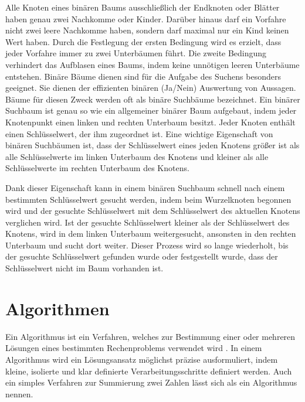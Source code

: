 Alle Knoten eines binären Baums ausschließlich der Endknoten oder Blätter haben genau zwei Nachkomme oder Kinder. Darüber hinaus darf ein Vorfahre nicht zwei leere Nachkomme haben, sondern darf maximal nur ein Kind keinen Wert haben. Durch die Festlegung der ersten Bedingung wird es erzielt, dass jeder Vorfahre immer zu zwei Unterbäumen führt. Die zweite Bedingung verhindert das Aufblasen eines Baums, indem keine unnötigen leeren Unterbäume entstehen. Binäre Bäume dienen sind für die Aufgabe des Suchens besonders geeignet. Sie dienen der effizienten binären (Ja/Nein) Auswertung von Aussagen. Bäume für diesen Zweck werden oft als binäre Suchbäume bezeichnet. Ein binärer Suchbaum ist genau so wie ein allgemeiner binärer Baum aufgebaut, indem jeder Knotenpunkt einen linken und rechten Unterbaum besitzt. Jeder Knoten enthält einen Schlüsselwert, der ihm zugeordnet ist. Eine wichtige Eigenschaft von binären Suchbäumen ist, dass der Schlüsselwert eines jeden Knotens größer ist als alle Schlüsselwerte im linken Unterbaum des Knotens und kleiner als alle Schlüsselwerte im rechten Unterbaum des Knotens. \autocite[94-95]{ollmert_datenstrukturen_2020}

Dank dieser Eigenschaft kann in einem binären Suchbaum schnell nach einem bestimmten Schlüsselwert gesucht werden, indem beim Wurzelknoten begonnen wird und der gesuchte Schlüsselwert mit dem Schlüsselwert des aktuellen Knotens verglichen wird. Ist der gesuchte Schlüsselwert kleiner als der Schlüsselwert des Knotens, wird in dem linken Unterbaum weitergesucht, ansonsten in den rechten Unterbaum und sucht dort weiter. Dieser Prozess wird so lange wiederholt, bis der gesuchte Schlüsselwert gefunden wurde oder festgestellt wurde, dass der Schlüsselwert nicht im Baum vorhanden ist. \autocite[139-141]{knebl_algorithmen_2021}
\section{Algorithmen}

Ein Algorithmus ist ein Verfahren, welches zur Bestimmung einer oder mehreren Lösungen eines bestimmten Rechenproblems verwendet wird \autocite[1]{knebl_algorithmen_2021}. In einem Algorithmus wird ein Lösungsansatz möglichst präzise ausformuliert, indem kleine, isolierte und klar definierte Verarbeitungsschritte definiert werden. Auch ein simples Verfahren zur Summierung zwei Zahlen lässt sich als ein Algorithmus nennen. \autocite[9-10]{hubwieser_fundamente_2015}